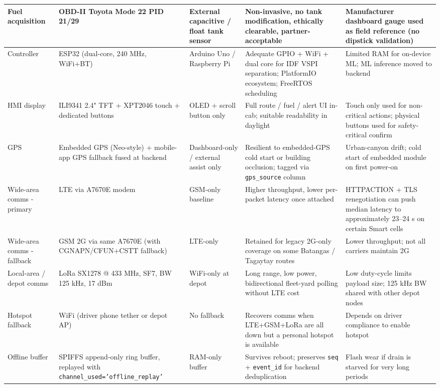 {\begin{longtable}{|p{}|p{}|p{}|p{}|p{}|}
Fuel acquisition & OBD-II Toyota Mode 22 PID 21/29 & External capacitive / float tank sensor & Non-invasive, no tank modification, ethically clearable, partner-acceptable & Manufacturer dashboard gauge used as field reference (no dipstick validation) \\
\hline
Controller & ESP32 (dual-core, 240 MHz, WiFi+BT\glsadd{BT}) & Arduino Uno / Raspberry Pi & Adequate GPIO + WiFi + dual core for IDF VSPI\glsadd{VSPI} separation; PlatformIO ecosystem; FreeRTOS scheduling & Limited RAM\glsadd{RAM} for on-device ML; ML inference moved to backend \\
\hline
HMI display & ILI9341 2.4" TFT + XPT2046 touch + dedicated buttons & OLED + scroll button only & Full route / fuel / alert UI\glsadd{UI} in-cab; suitable readability in daylight & Touch only used for non-critical actions; physical buttons used for safety-critical confirm \\
\hline
GPS & Embedded GPS (Neo-style) + mobile-app GPS fallback fused at backend & Dashboard-only / external assist only & Resilient to embedded-GPS cold start or building occlusion; tagged via \texttt{gps\_source} column & Urban-canyon drift; cold start of embedded module on first power-on \\
\hline
Wide-area comms - primary & LTE via A7670E modem & GSM-only baseline & Higher throughput, lower per-packet latency once attached & HTTPACTION + TLS renegotiation can push median latency to approximately 23--24 s on certain Smart cells \\
\hline
Wide-area comms - fallback & GSM 2G via same A7670E (with CGNAPN/CFUN+CSTT fallback) & LTE-only & Retained for legacy 2G-only coverage on some Batangas / Tagaytay routes & Lower throughput; not all carriers maintain 2G \\
\hline
Local-area / depot comms & LoRa SX1278 @ 433 MHz, SF7, BW 125 kHz, 17 dBm & WiFi-only at depot & Long range, low power, bidirectional fleet-yard polling without LTE cost & Low duty-cycle limits payload size; 125 kHz BW shared with other depot nodes \\
\hline
Hotspot fallback & WiFi (driver phone tether or depot AP) & No fallback & Recovers comms when LTE+GSM+LoRa are all down but a personal hotspot is available & Depends on driver compliance to enable hotspot \\
\hline
Offline buffer & SPIFFS append-only ring buffer, replayed with \texttt{channel\_used='offline\_replay'} & RAM-only buffer & Survives reboot; preserves \texttt{seq} + \texttt{event\_id} for backend deduplication & Flash wear if drain is starved for very long periods \\

\end{longtable}}
